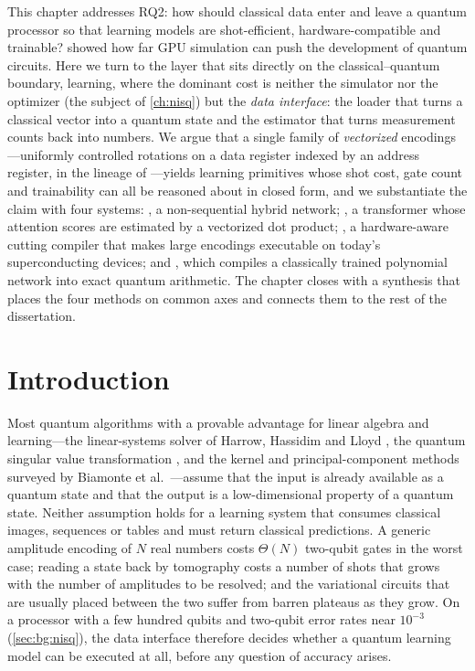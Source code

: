 This chapter addresses RQ2: how should classical data enter and leave a quantum processor so that learning models are shot-efficient, hardware-compatible and trainable?  showed how far GPU simulation can push the development of quantum circuits. Here we turn to the layer that sits directly on the classical--quantum boundary, learning, where the dominant cost is neither the simulator nor the optimizer (the subject of \cref{ch:nisq}) but the \emph{data interface}: the loader that turns a classical vector into a quantum state and the estimator that turns measurement counts back into numbers. We argue that a single family of \emph{vectorized} encodings---uniformly controlled rotations on a data register indexed by an address register, in the lineage of \qcrank{} \cite{balewski2024qcrank}---yields learning primitives whose shot cost, gate count and trainability can all be reasoned about in closed form, and we substantiate the claim with four systems: \qpie{}, a non-sequential hybrid network; \vqt{}, a transformer whose attention scores are estimated by a vectorized dot product; \shardq{}, a hardware-aware cutting compiler that makes large encodings executable on today's superconducting devices; and \nnqa{}, which compiles a classically trained polynomial network into exact quantum arithmetic. The chapter closes with a synthesis that places the four methods on common axes and connects them to the rest of the dissertation.

\section{Introduction}\label{sec:qml:intro}

Most quantum algorithms with a provable advantage for linear algebra and learning---the linear-systems solver of Harrow, Hassidim and Lloyd \cite{harrow2009hhl}, the quantum singular value transformation \cite{gilyen2019qsvt}, and the kernel and principal-component methods surveyed by Biamonte et al.~\cite{biamonte2017qml}---assume that the input is already available as a quantum state and that the output is a low-dimensional property of a quantum state. Neither assumption holds for a learning system that consumes classical images, sequences or tables and must return classical predictions. A generic amplitude encoding of $N$ real numbers costs $\Theta(N)$ two-qubit gates in the worst case; reading a state back by tomography costs a number of shots that grows with the number of amplitudes to be resolved; and the variational circuits that are usually placed between the two suffer from barren plateaus \cite{mcclean2018barren} as they grow. On a processor with a few hundred qubits and two-qubit error rates near $10^{-3}$ (\cref{sec:bg:nisq}), the data interface therefore decides whether a quantum learning model can be executed at all, before any question of accuracy arises.

